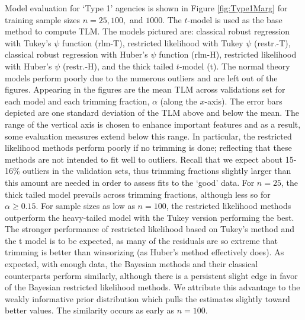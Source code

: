 \documentclass[11pt]{article}
\begin{document}
Model evaluation for `Type 1' agencies is shown in Figure
\ref{fig:Type1Marg} for training sample sizes $n=25, 100,$ and $1000$.
The $t$-model is used as the base
  method to compute TLM.
The models pictured are: classical robust regression with Tukey's $\psi$ function (rlm-T), restricted likelihood with Tukey $\psi$ (restr.-T), classical robust regression with Huber's $\psi$ function (rlm-H), restricted likelihood  with Huber's $\psi$ (restr.-H), and the thick tailed $t$-model (t). The normal theory models perform poorly due to the numerous outliers
and are left out of the figures. Appearing in the figures are the mean TLM across
validations set for each model and each trimming fraction, $\alpha$ (along the $x$-axis). The error bars depicted are one standard deviation of the TLM above and below the mean.  The range of the vertical axis is chosen to enhance important features and as a result, some evaluation measures extend below this range. In particular, the restricted likelihood methods perform poorly if no trimming is done; reflecting that these methods are not intended to fit well to outliers. Recall that we expect about 15-16\% outliers in the validation sets, thus trimming fractions slightly larger than this amount are needed in order to assess fits to the `good' data. For $n=25$, the thick tailed model  prevails across trimming fractions, although less so for $\alpha\geq 0.15$. For sample sizes as low as $n=100$, the restricted likelihood methods outperform the heavy-tailed model with the Tukey version performing the best.   
The stronger performance of restricted likelihood based on Tukey's method and the t model is to be expected, as many of the 
residuals are so extreme that trimming is better than winsorizing (as Huber's method effectively does).  
As expected, with enough data,  the Bayesian methods and their classical counterparts perform similarly, although there
is a persistent slight edge in favor of the Bayesian restricted likelihood methods.  We attribute this advantage to the weakly informative
prior distribution which pulls the estimates slightly toward better values.  The similarity occurs as early as $n=100$. 

 
\end{document}
